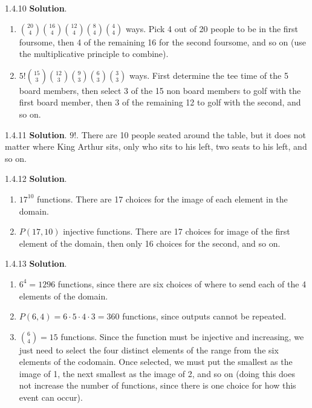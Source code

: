 \documentclass[11pt,]{book}
\theoremstyle{ptxplainnotitle}
\theoremstyle{ptxplaintitle}
\theoremstyle{ptxdefinitionnotitle}
\theoremstyle{ptxdefinitiontitle}
\theoremstyle{ptxdefinitionnotitle}
\theoremstyle{ptxdefinitiontitle}
\theoremstyle{ptxdefinitionnotitle}
\theoremstyle{ptxdefinitiontitle}
\theoremstyle{ptxdefinitiontitlenonumber}
\theoremstyle{ptxdefinitiontitlenonumber}
\numberwithin{equation}{chapter}
\begin{document}
\begin{divisionexercise}{1.4.10}
\textbf{Solution}.\quad%
\hypertarget{p-1703}{}%
\leavevmode%
\begin{enumerate}[label=\alph*.]
\item\hypertarget{li-717}{}\hypertarget{p-1704}{}%
\({20 \choose 4}{16 \choose 4}{12 \choose 4}{8 \choose 4}{4 \choose 4}\) ways. Pick 4 out of 20 people to be in the first foursome, then 4 of the remaining 16 for the second foursome, and so on (use the multiplicative principle to combine).%
\item\hypertarget{li-718}{}\hypertarget{p-1705}{}%
\(5!{15 \choose 3}{12 \choose 3}{9 \choose 3}{6 \choose 3}{3 \choose 3}\) ways. First determine the tee time of the 5 board members, then select 3 of the 15 non board members to golf with the first board member, then 3 of the remaining 12 to golf with the second, and so on.%
\end{enumerate}
%
\end{divisionexercise}%
\begin{divisionexercise}{1.4.11}
\textbf{Solution}.\quad%
\hypertarget{p-1711}{}%
\(9!\text{.}\) There are 10 people seated around the table, but it does not matter where King Arthur sits, only who sits to his left, two seats to his left, and so on.%
\end{divisionexercise}%
\begin{divisionexercise}{1.4.12}
\textbf{Solution}.\quad%
\hypertarget{p-1725}{}%
\leavevmode%
\begin{enumerate}[label=\alph*.]
\item\hypertarget{li-725}{}\hypertarget{p-1726}{}%
\(17^{10}\) functions.  There are 17 choices for the image of each element in the domain.%
\item\hypertarget{li-726}{}\hypertarget{p-1727}{}%
\(P(17, 10)\) injective functions.  There are 17 choices for image of the first element of the domain, then only 16 choices for the second, and so on.%
\end{enumerate}
%
\end{divisionexercise}%
\begin{divisionexercise}{1.4.13}
\textbf{Solution}.\quad%
\hypertarget{p-1746}{}%
\leavevmode%
\begin{enumerate}[label=\alph*.]
\item\hypertarget{li-736}{}\hypertarget{p-1747}{}%
\(6^4 = 1296\) functions, since there are six choices of where to send each of the 4 elements of the domain.%
\item\hypertarget{li-737}{}\hypertarget{p-1748}{}%
\(P(6, 4) = 6 \cdot 5 \cdot 4 \cdot 3 = 360\) functions, since outputs cannot be repeated.%
\item\hypertarget{li-738}{}\hypertarget{p-1749}{}%
\({6 \choose 4} = 15\) functions. Since the function must be injective and increasing, we just need to select the four distinct elements of the range from the six elements of the codomain.  Once selected, we must put the smallest as the image of 1, the next smallest as  the image of 2, and so on (doing this does not increase the number of functions, since there is one choice for how this event can occur).%
\end{enumerate}
%
\end{divisionexercise}%
\end{document}
